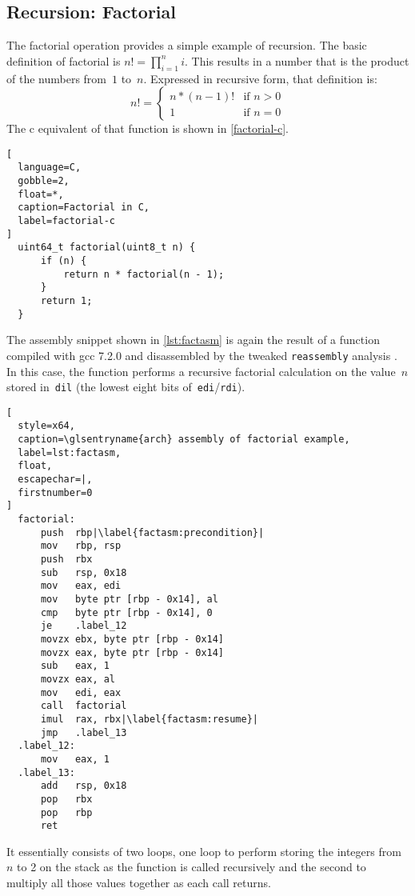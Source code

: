 \subsection{Recursion: Factorial}\label{sse:factorial_example}
The factorial operation provides a simple example of recursion.%
%
The basic definition of factorial is $n!=\prod_{i=1}^n i$.%
This results in a number that is the product of the numbers from~$1$ to~$n$.
Expressed in recursive form, that definition is:
\begin{equation}
  n!=\begin{cases}
    n * (n - 1)! & \text{if }n > 0 \\
    1 & \text{if }n = 0
  \end{cases}
\end{equation}
The \gls{c} equivalent of that function is shown in \cref{factorial-c}.
\begin{lstlisting}[
  language=C,
  gobble=2,
  float=*,
  caption=Factorial in C,
  label=factorial-c
]
  uint64_t factorial(uint8_t n) {
      if (n) {
          return n * factorial(n - 1);
      }
      return 1;
  }
\end{lstlisting}
The assembly snippet shown in \cref{lst:factasm} is again
the result of a function compiled with \ac{gcc} 7.2.0
and disassembled by the tweaked \lstinline|reassembly| analysis \autocite{wang2017ramblr}.
In this case, the function performs a recursive factorial calculation on the value~$n$
stored in~\lstinline|dil| (the lowest eight bits of~\lstinline|edi|/\lstinline|rdi|).
\begin{lstlisting}[
  style=x64,
  caption=\glsentryname{arch} assembly of factorial example,
  label=lst:factasm,
  float,
  escapechar=|,
  firstnumber=0
]
  factorial:
      push  rbp|\label{factasm:precondition}|
      mov   rbp, rsp
      push  rbx
      sub   rsp, 0x18
      mov   eax, edi
      mov   byte ptr [rbp - 0x14], al
      cmp   byte ptr [rbp - 0x14], 0
      je    .label_12
      movzx ebx, byte ptr [rbp - 0x14]
      movzx eax, byte ptr [rbp - 0x14]
      sub   eax, 1
      movzx eax, al
      mov   edi, eax
      call  factorial
      imul  rax, rbx|\label{factasm:resume}|
      jmp   .label_13
  .label_12:
      mov   eax, 1
  .label_13:
      add   rsp, 0x18
      pop   rbx
      pop   rbp
      ret
\end{lstlisting}
It essentially consists of two loops,
one loop to perform storing the integers from~$n$ to 2 on the stack as the function
is called recursively
and the second to multiply all those values together as each call returns.

